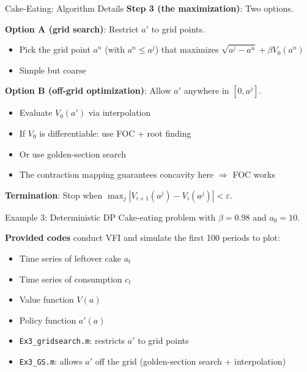 \documentclass[blue]{beamer}
\begin{document}
\begin{frame}{Cake-Eating: Algorithm Details}
	\textbf{Step 3 (the maximization)}: Two options.

	\textbf{Option A (grid search)}: Restrict $a'$ to grid points.
	\begin{itemize}
		\item Pick the grid point $a^n$ (with $a^n \leq a^j$) that maximizes $\sqrt{a^j - a^n} + \beta V_0(a^n)$
		\item Simple but coarse
	\end{itemize}
	
	\bigskip
	\textbf{Option B (off-grid optimization)}: Allow $a'$ anywhere in $[0, a^j]$.
	\begin{itemize}
		\item Evaluate $V_0(a')$ via interpolation 
		\item If $V_0$ is differentiable: use FOC + root finding 
		\item Or use golden-section search
		\item The contraction mapping guarantees concavity here $\Rightarrow$ FOC works
	\end{itemize}

\bigskip
	\textbf{Termination}: Stop when $\max_j |V_{i+1}(a^j) - V_i(a^j)| < \varepsilon$.
\end{frame}


\begin{frame}{Example 3: Deterministic DP}
	Cake-eating problem with $\beta = 0.98$ and $a_0 = 10$.
	
	\bigskip
	\textbf{Provided codes} conduct VFI and simulate the first 100 periods to plot:
	\begin{itemize}
		\item Time series of leftover cake $a_t$
		\item Time series of consumption $c_t$
		\item Value function $V(a)$
		\item Policy function $a'(a)$
	\end{itemize}
	
	\bigskip
	\begin{itemize}
		\item \texttt{Ex3\_gridsearch.m}: restricts $a'$ to grid points
		\item \texttt{Ex3\_GS.m}: allows $a'$ off the grid (golden-section search + interpolation)
	\end{itemize}
\end{frame}
\end{document}
